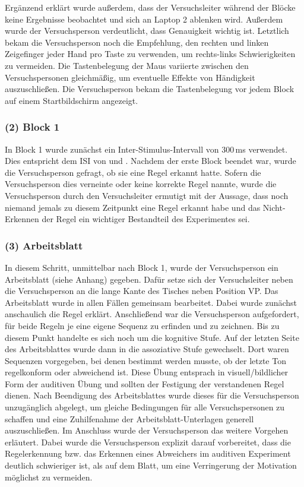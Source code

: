 \documentclass[doc,a4paper,12pt]{apa6}
\begin{document}
Ergänzend erklärt wurde außerdem, dass der Versuchsleiter während der Blöcke keine Ergebnisse beobachtet und sich an Laptop 2 ablenken wird. Außerdem wurde der Versuchsperson verdeutlicht, dass Genauigkeit wichtig ist. Letztlich bekam die Versuchsperson noch die Empfehlung, den rechten und linken Zeigefinger jeder Hand pro Taste zu verwenden, um rechts-links Schwierigkeiten zu vermeiden. Die Tastenbelegung der Maus variierte zwischen den Versuchspersonen gleichmäßig, um eventuelle Effekte von Händigkeit auszuschließen. Die Versuchsperson bekam die Tastenbelegung vor jedem Block auf einem Startbildschirm angezeigt.

\subsubsection{(2) Block 1}

In Block 1 wurde zunächst ein Inter-Stimulus-Intervall von 300\,ms verwendet. Dies entspricht dem ISI von \textcite{paavilainen2007preattentive} und \textcite{bendixen2008rapid}. Nachdem der erste Block beendet war, wurde die Versuchsperson gefragt, ob sie eine Regel erkannt hatte. Sofern die Versuchsperson dies verneinte oder keine korrekte Regel nannte, wurde die Versuchsperson durch den Versuchsleiter ermutigt mit der Aussage, dass noch niemand jemals zu diesem Zeitpunkt eine Regel erkannt habe und das Nicht-Erkennen der Regel ein wichtiger Bestandteil des Experimentes sei.

\subsubsection{(3) Arbeitsblatt}

In diesem Schritt, unmittelbar nach Block 1, wurde der Versuchsperson ein Arbeitsblatt (siehe Anhang) gegeben. Dafür setze sich der Versuchsleiter neben die Versuchsperson an die lange Kante des Tisches neben Position VP. Das Arbeitsblatt wurde in allen Fällen gemeinsam bearbeitet. Dabei wurde zunächst anschaulich die Regel erklärt. Anschließend war die Versuchsperson aufgefordert, für beide Regeln je eine eigene Sequenz zu erfinden und zu zeichnen. Bis zu diesem Punkt handelte es sich noch um die kognitive Stufe. Auf der letzten Seite des Arbeitsblattes wurde dann in die assoziative Stufe gewechselt. Dort waren Sequenzen vorgegeben, bei denen bestimmt werden musste, ob der letzte Ton regelkonform oder abweichend ist. Diese Übung entsprach in visuell/bildlicher Form der auditiven Übung und sollten der Festigung der verstandenen Regel dienen. Nach Beendigung des Arbeitsblattes wurde dieses für die Versuchsperson unzugänglich abgelegt, um gleiche Bedingungen für alle Versuchspersonen zu schaffen und eine Zuhilfenahme der Arbeitsblatt-Unterlagen generell auszuschließen. Im Anschluss wurde der Versuchsperson das weitere Vorgehen erläutert. Dabei wurde die Versuchsperson explizit darauf vorbereitet, dass die Regelerkennung bzw. das Erkennen eines Abweichers im auditiven Experiment deutlich schwieriger ist, als auf dem Blatt, um eine Verringerung der Motivation möglichst zu vermeiden.
\end{document}
